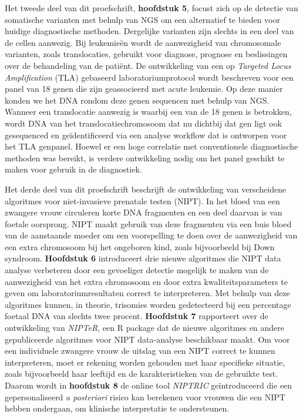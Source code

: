 \begin{appendices}
	Het tweede deel van dit proefschrift, \textbf{hoofdstuk 5}, focust zich op de detectie van somatische varianten met behulp van NGS om een alternatief te bieden voor huidige diagnostische methoden. Dergelijke varianten zijn slechts in een deel van de cellen aanwezig. Bij leukemieën wordt de aanwezigheid van chromosomale varianten, zoals translocaties, gebruikt voor diagnose, prognose en beslissingen over de behandeling van de patiënt. De ontwikkeling van een op \textsl{Targeted Locus Amplification} (TLA) gebaseerd laboratoriumprotocol wordt beschreven voor een panel van 18 genen die zijn geassocieerd met acute leukemie. Op deze manier konden we het DNA rondom deze genen sequencen met behulp van NGS. Wanneer een translocatie aanwezig is waarbij een van de 18 genen is betrokken, wordt DNA van het translocatiechromosoom dat nu dichtbij dat gen ligt ook gesequenced en geïdentificeerd via een analyse workflow dat is ontworpen voor het TLA genpanel. Hoewel er een hoge correlatie met conventionele diagnostische methoden was bereikt, is verdere ontwikkeling nodig om het panel geschikt te maken voor gebruik in de diagnostiek.
	
	Het derde deel van dit proefschrift beschrijft de ontwikkeling van verscheidene algoritmes voor niet-invasieve prenatale testen (NIPT). In het bloed van een zwangere vrouw circuleren korte DNA fragmenten en een deel daarvan is van foetale oorsprong. NIPT maakt gebruik van deze fragmenten via een buis bloed van de aanstaande moeder om een voorspelling te doen over de aanwezigheid van een extra chromosoom bij het ongeboren kind, zoals bijvoorbeeld bij Down syndroom. \textbf{Hoofdstuk 6} introduceert drie nieuwe algoritmes die NIPT data analyse verbeteren door een gevoeliger detectie mogelijk te maken van de aanwezigheid van het extra chromosoom en door extra kwaliteitsparameters te geven om laboratoriumresultaten correct te interpreteren. Met behulp van deze algoritmes kunnen, in theorie, trisomies worden gedetecteerd bij een percentage foetaal DNA van slechts twee procent. \textbf{Hoofdstuk 7} rapporteert over de ontwikkeling van \textsl{NIPTeR}, een R package dat de nieuwe algoritmes en andere gepubliceerde algoritmes voor NIPT data-analyse beschikbaar maakt. Om voor een individuele zwangere vrouw de uitslag van een NIPT correct te kunnen interpreteren, moet er rekening worden gehouden met haar specifieke situatie, zoals bijvoorbeeld haar leeftijd en de karakteristieken van de gebruikte test. Daarom wordt in \textbf{hoofdstuk 8} de online tool \textsl{NIPTRIC} geïntroduceerd die een gepersonaliseerd \textsl{a posteriori} risico kan berekenen voor vrouwen die een NIPT hebben ondergaan, om klinische interpretatie te ondersteunen.
	

\end{appendices}
